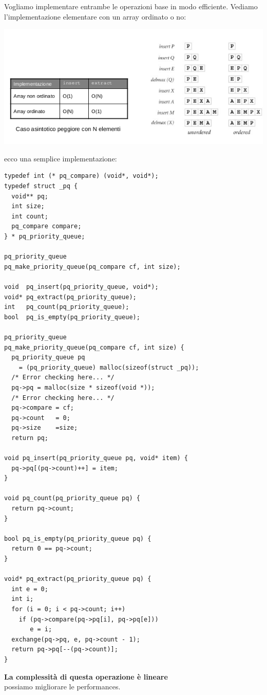 \documentclass[a4paper,12pt, oneside]{book}
\begin{document}
\newpage
Vogliamo implementare entrambe le operazioni base in modo efficiente. Vediamo l'implementazione elementare
con un array ordinato o no:
\begin{center}
	\includegraphics[scale=2.5]{img/c6.png}
\end{center}
ecco una semplice implementazione:
\begin{verbatim}
typedef int (* pq_compare) (void*, void*);
typedef struct _pq {
  void** pq;
  int size;
  int count;
  pq_compare compare;
} * pq_priority_queue;

pq_priority_queue
pq_make_priority_queue(pq_compare cf, int size);

void  pq_insert(pq_priority_queue, void*);
void* pq_extract(pq_priority_queue);
int   pq_count(pq_priority_queue);
bool  pq_is_empty(pq_priority_queue);

pq_priority_queue
pq_make_priority_queue(pq_compare cf, int size) {
  pq_priority_queue pq
    = (pq_priority_queue) malloc(sizeof(struct _pq));
  /* Error checking here... */
  pq->pq = malloc(size * sizeof(void *));
  /* Error checking here... */
  pq->compare = cf;
  pq->count   = 0;
  pq->size    =size;
  return pq;
  
void pq_insert(pq_priority_queue pq, void* item) {
  pq->pq[(pq->count)++] = item;
}

void pq_count(pq_priority_queue pq) {
  return pq->count;
}

bool pq_is_empty(pq_priority_queue pq) {
  return 0 == pq->count;
}

void* pq_extract(pq_priority_queue pq) {
  int e = 0;
  int i;
  for (i = 0; i < pq->count; i++)
    if (pq->compare(pq->pq[i], pq->pq[e]))
       e = i;
  exchange(pq->pq, e, pq->count - 1);
  return pq->pq[--(pq->count)];
}
\end{verbatim}
\textbf{La complessità di questa operazione è lineare}\\
possiamo migliorare le performances.\\
\end{document}
